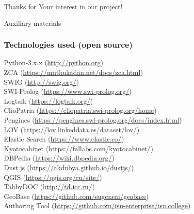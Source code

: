 \documentclass[10pt]{beamer}
\begin{document}
\begin{frame}
  \begin{center}
  \Large Thanks for Your interest in our project!
\end{center}
\end{frame}

\begin{frame}
  \begin{center}
  \Large Auxiliary materials
\end{center}
\end{frame}

\begin{frame}
  \frametitle{Technologies used (open source)}
  Python-3.x.x (\url{http://python.org})\\
  ZCA (\url{https://muthukadan.net/docs/zca.html})\\
  SWIG (\url{http://swig.org/})\\
  SWI-Prolog (\url{https://www.swi-prolog.org/})\\
  Logtalk (\url{https://logtalk.org/})\\
  ClioPatria (\url{https://cliopatria.swi-prolog.org/home})\\
  Pengines (\url{https://pengines.swi-prolog.org/docs/index.html})\\
  LOV (\url{https://lov.linkeddata.es/dataset/lov/})\\
  Elastic Search (\url{https://www.elastic.co/})\\
  Kyotocabinet (\url{https://fallabs.com/kyotocabinet/})\\
  DBPedia (\url{https://wiki.dbpedia.org/})\\
  Dust.js (\url{https://akdubya.github.io/dustjs/})\\
  QGIS (\url{https://qgis.org/ru/site/})\\
  TabbyDOC (\url{http://td.icc.ru/})\\
  GeoBase (\url{https://github.com/eugeneai/geobase})\\
  Authoring Tool (\url{https://github.com/isu-enterprise/isu.college})
\end{frame}
\end{document}
